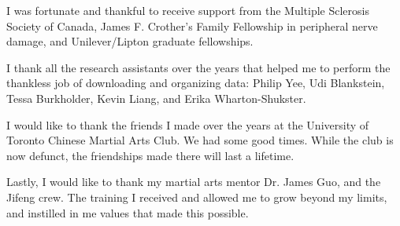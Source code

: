 \begin{acknowledgements}
{I was fortunate and thankful to receive support from the Multiple Sclerosis Society of Canada, James F. Crother's Family Fellowship in peripheral nerve damage, and Unilever/Lipton graduate fellowships. 

I thank all the research assistants over the years that helped me to perform the thankless job of downloading and organizing data: Philip Yee, Udi Blankstein, Tessa Burkholder, Kevin Liang, and Erika Wharton-Shukster. 

I would like to thank the friends I made over the years at the University of Toronto Chinese Martial Arts Club. We had some good times. While the club is now defunct, the friendships made there will last a lifetime. 

Lastly, I would like to thank my martial arts mentor Dr. James Guo, and the Jifeng crew. The training I received and allowed me to grow beyond my limits, and instilled in me values that made this possible.
}
\end{acknowledgements}